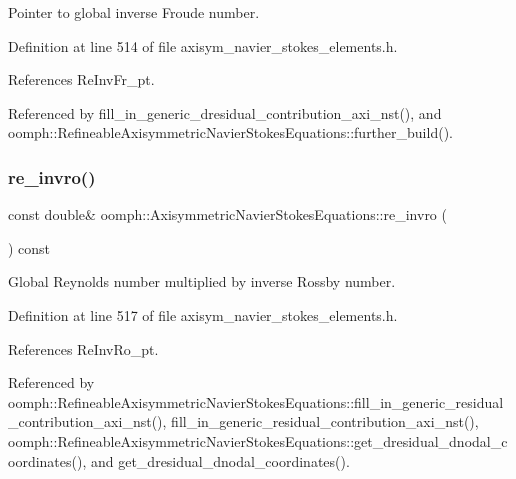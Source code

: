 Pointer to global inverse Froude number. 



Definition at line 514 of file axisym\+\_\+navier\+\_\+stokes\+\_\+elements.\+h.



References Re\+Inv\+Fr\+\_\+pt.



Referenced by fill\+\_\+in\+\_\+generic\+\_\+dresidual\+\_\+contribution\+\_\+axi\+\_\+nst(), and oomph\+::\+Refineable\+Axisymmetric\+Navier\+Stokes\+Equations\+::further\+\_\+build().

\mbox{\label{classoomph_1_1AxisymmetricNavierStokesEquations_a30e9502122f5c88cdfb33edb45d88c5f}} 
\subsubsection{\texorpdfstring{re\+\_\+invro()}{re\_invro()}}
{\footnotesize\ttfamily const double\& oomph\+::\+Axisymmetric\+Navier\+Stokes\+Equations\+::re\+\_\+invro (\begin{DoxyParamCaption}{ }\end{DoxyParamCaption}) const\hspace{0.3cm}{\ttfamily [inline]}}



Global Reynolds number multiplied by inverse Rossby number. 



Definition at line 517 of file axisym\+\_\+navier\+\_\+stokes\+\_\+elements.\+h.



References Re\+Inv\+Ro\+\_\+pt.



Referenced by oomph\+::\+Refineable\+Axisymmetric\+Navier\+Stokes\+Equations\+::fill\+\_\+in\+\_\+generic\+\_\+residual\+\_\+contribution\+\_\+axi\+\_\+nst(), fill\+\_\+in\+\_\+generic\+\_\+residual\+\_\+contribution\+\_\+axi\+\_\+nst(), oomph\+::\+Refineable\+Axisymmetric\+Navier\+Stokes\+Equations\+::get\+\_\+dresidual\+\_\+dnodal\+\_\+coordinates(), and get\+\_\+dresidual\+\_\+dnodal\+\_\+coordinates().

